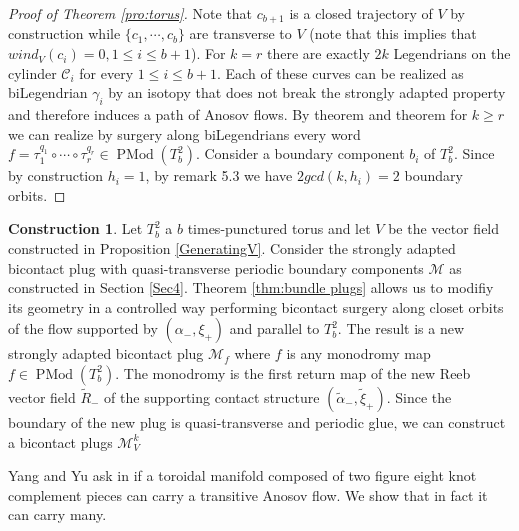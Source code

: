 \documentclass{amsart}
\theoremstyle{definition}
\newtheorem{construction}[theorem]{Construction}
\theoremstyle{remark}
\DeclareMathOperator{\PMod}{PMod}
\begin{document}
 \begin{proof}[Proof of Theorem \ref{pro:torus}]
     Note that $c_{b+1}$ is a closed trajectory of $V$ by construction while $\{c_1,\cdots,c_b\}$ are transverse to $V$ (note that this implies that $wind_V(c_i)=0, 1\leq i\leq b+1$). For $k=r$ there are exactly $2k$ Legendrians on the cylinder $\mathcal{C}_i$ for every $ 1\leq i\leq b+1$. Each of these curves can be realized as biLegendrian $\gamma_i$ by an isotopy that does not break the strongly adapted property and therefore induces a path of Anosov flows. By theorem and theorem for $k\geq r$ we can realize by surgery along biLegendrians every word $f=\tau^{q_1}_1\circ \cdots \circ \tau^{q_r}_r\in \PMod(T^2_b)$. Consider a boundary component $b_i$ of $T^2_b$. Since by construction $h_i=1$, by remark 5.3 we have $2 gcd(k,h_i)=2$ boundary orbits.
 \end{proof}   
 

\begin{construction}
    Let $T_b^2$ a $b$ times-punctured torus and let $V$ be the vector field constructed in Proposition \ref{GeneratingV}. Consider the strongly adapted bicontact plug with quasi-transverse periodic boundary components $\mathcal{M}$ as constructed in Section \ref{Sec4}. Theorem \ref{thm:bundle plugs} allows us to modifiy its geometry in a controlled way performing bicontact surgery along closet orbits of the flow supported by $(\alpha_-,\xi_+)$ and parallel to $T_b^2$. The result is a new strongly adapted bicontact plug $\mathcal{M}_f$ where $f$ is any monodromy map $f\in \PMod(T_b^2)$. The monodromy is the first return map of the new Reeb vector field $\tilde{R}_-$ of the supporting contact structure $(\tilde{\alpha}_-,\tilde{\xi}_+)$. Since the boundary of the new plug  is quasi-transverse and periodic glue,  we can construct a bicontact plugs $\mathcal{M}_V^k$
\end{construction}



Yang and Yu ask in \cite[Question 1.3]{YangYu2022Classifying} if a toroidal manifold composed of two figure eight knot complement pieces can carry a transitive Anosov flow. We show that in fact it can carry many.
\end{document}
